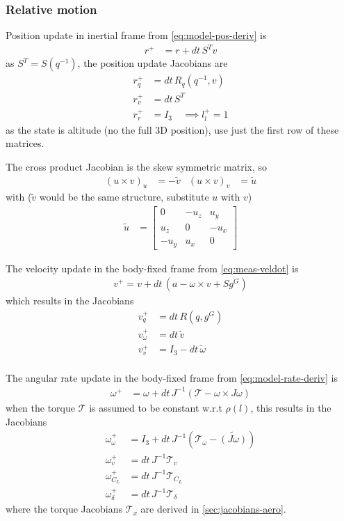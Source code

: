 \subsubsection{Relative motion}
Position update in inertial frame from \autoref{eq:model-pos-deriv}
is 
\begin{align}
    r^+ &= r + dt \, S^T v
\end{align}
as $S^T = S(q^{-1})$, the position update Jacobians are
\begin{align}
    r^+_q &= dt \, R_q(q^{-1},v) \\
    r^+_v &= dt \, S^T \\
    r^+_r &= I_3 \quad \implies l^+_l = 1
\end{align}
as the state is altitude (no the full 3D position), use just the first row of these matrices. 

The cross product Jacobian is the skew symmetric matrix, so 
\begin{align}
    (u \times v)_u &= - \tilde v 
    &
    (u \times v)_v &= \tilde u
\end{align}
with ($\tilde v$ would be the same structure, substitute $u$ with $v$)
\begin{align}
    \tilde u &= \begin{bmatrix}
        0 & -u_z & u_y \\ u_z & 0 & -u_x \\ -u_y & u_x & 0
    \end{bmatrix} 
\end{align}

The velocity update in the body-fixed frame from \autoref{eq:meas-veldot} is
\begin{align}
    v^+ = v + dt \, (a -\omega \times v + S g^G)
\end{align}
which results in the Jacobians
\begin{align}
    v^+_q &= dt \, R(q,g^G) \\
    v^+_\omega &= dt \, \tilde v \\
    v^+_v &= I_3 - dt \, \tilde \omega\\
\end{align}

The angular rate update in the body-fixed frame from \autoref{eq:model-rate-deriv} is
\begin{align}
   \omega^+ &= \omega + dt \, J^{-1} (\mathcal{T} - \omega \times J \omega)
\end{align}
when the torque $\mathcal{T}$ is assumed to be constant w.r.t $\rho(l)$, this results in the Jacobians
\begin{align}
    \omega^+_\omega &= I_3 + dt \,  J^{-1} (\mathcal{T}_\omega - \tilde {(J \omega)} )  \\
    \omega^+_v &= dt \, J^{-1} \mathcal{T}_v \\
    \omega^+_{C_L} &= dt \, J^{-1} \mathcal{T}_{C_L} \\
    \omega^+_\delta &= dt \, J^{-1} \mathcal{T}_\delta
\end{align}
where the torque Jacobians $\mathcal{T}_x$ are derived in \autoref{sec:jacobians-aero}.


